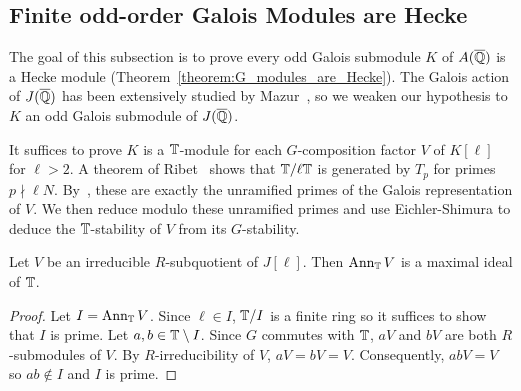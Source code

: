 \documentclass{article}
\begin{document}
\subsection{Finite odd-order Galois Modules are Hecke}%
\label{sub:finite_odd_order_galois_modules_are_hecke}

The goal of this subsection is to prove every odd Galois submodule $K$ of
$A(\overline{\mathbb{Q}})$ is a Hecke module (Theorem~\ref{theorem:G_modules_are_Hecke}). The
Galois action of $J(\overline{\mathbb{Q}})$ has been extensively studied by
Mazur~\cite{mazur:eisenstein}, so we weaken our hypothesis to $K$ an odd Galois
submodule of $J(\overline{\mathbb{Q}})$. 

It suffices to prove $K$ is a $\mathbb{T}$-module for each $G$-composition factor $V$
of $K[\ell]$ for $\ell>2$. A theorem of Ribet~\cite[Proposition
2]{ribet:mult_p_finite}
shows that $\mathbb{T}/\ell \mathbb{T}$ is generated by $T_p$ for primes $p\nmid \ell N$.
By~\cite[\S 14]{mazur:eisenstein}, these are exactly the unramified primes of
the Galois representation of $V$. We then reduce modulo these unramified
primes and use Eichler-Shimura to deduce the $\mathbb{T}$-stability of $V$ from its
$G$-stability.

\begin{lemma}\label{lemma:cherry_street}
    Let $V$ be an irreducible $R$-subquotient of $J[\ell]$. Then $\operatorname{Ann}_{\mathbb{T}} V$
    is a maximal ideal of $\mathbb{T}$.
\end{lemma}
\begin{proof}
    Let $I=\operatorname{Ann}_{\mathbb{T}} V$. Since $\ell\in I$, $\mathbb{T}/I$ is a finite ring so it
    suffices to show that $I$ is prime. Let $a,b\in \mathbb{T}\setminus I$. Since $G$
    commutes with $\mathbb{T}$, $aV$ and $bV$ are both $R$-submodules of $V$. By
    $R$-irreducibility of $V$, $aV=bV=V$. Consequently, $abV=V$ so $ab\notin I$
    and $I$ is prime.
\end{proof}
\end{document}

